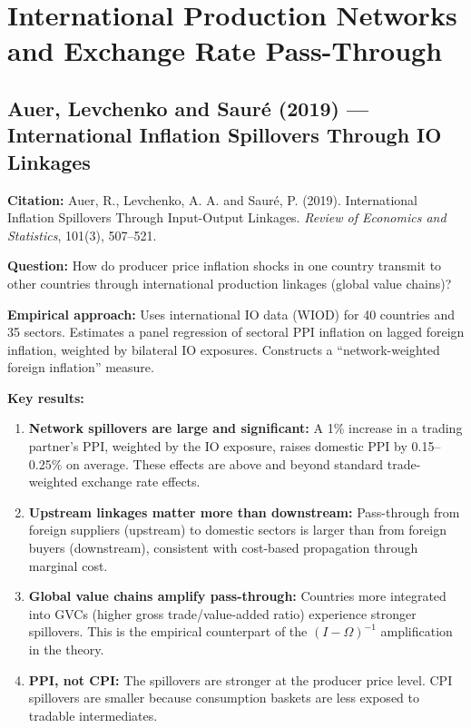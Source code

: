 \documentclass[12pt]{article}
\begin{document}
\section{International Production Networks and Exchange Rate Pass-Through}

\subsection{Auer, Levchenko and Sauré (2019) --- International Inflation Spillovers Through IO Linkages}

\textbf{Citation:} Auer, R., Levchenko, A. A. and Sauré, P. (2019). International Inflation Spillovers Through Input-Output Linkages. \textit{Review of Economics and Statistics}, 101(3), 507--521.

\textbf{Question:} How do producer price inflation shocks in one country transmit to other countries through international production linkages (global value chains)?

\textbf{Empirical approach:} Uses international IO data (WIOD) for 40 countries and 35 sectors. Estimates a panel regression of sectoral PPI inflation on lagged foreign inflation, weighted by bilateral IO exposures. Constructs a ``network-weighted foreign inflation'' measure.

\textbf{Key results:}
\begin{enumerate}
    \item \textbf{Network spillovers are large and significant:} A 1\% increase in a trading partner's PPI, weighted by the IO exposure, raises domestic PPI by 0.15--0.25\% on average. These effects are above and beyond standard trade-weighted exchange rate effects.
    \item \textbf{Upstream linkages matter more than downstream:} Pass-through from foreign suppliers (upstream) to domestic sectors is larger than from foreign buyers (downstream), consistent with cost-based propagation through marginal cost.
    \item \textbf{Global value chains amplify pass-through:} Countries more integrated into GVCs (higher gross trade/value-added ratio) experience stronger spillovers. This is the empirical counterpart of the $(I-\Omega)^{-1}$ amplification in the theory.
    \item \textbf{PPI, not CPI:} The spillovers are stronger at the producer price level. CPI spillovers are smaller because consumption baskets are less exposed to tradable intermediates.
\end{enumerate}
\end{document}
